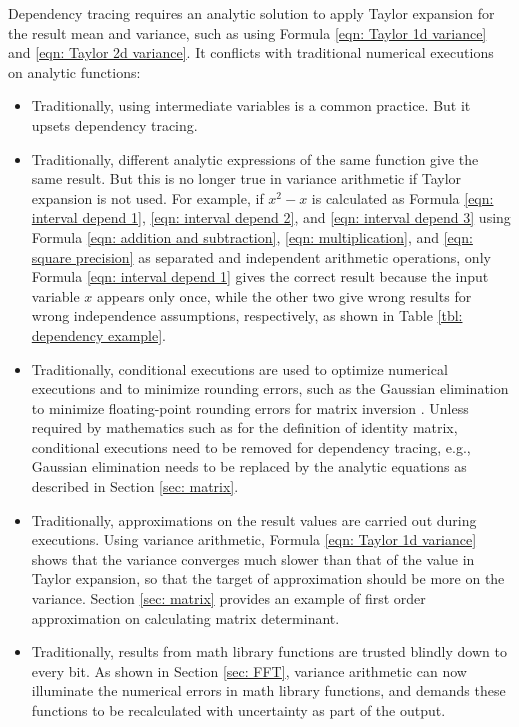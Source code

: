 \documentclass[twoside]{article}
\numberwithin{equation}{section}
\begin{document}
Dependency tracing requires an analytic solution to apply Taylor expansion for the result mean and variance, such as using Formula \eqref{eqn: Taylor 1d variance} and \eqref{eqn: Taylor 2d variance}.
It conflicts with traditional numerical executions on analytic functions:
\begin{itemize}

\item
Traditionally, using intermediate variables is a common practice.
But it upsets dependency tracing.

\item 
Traditionally, different analytic expressions of the same function give the same result.
But this is no longer true in variance arithmetic if Taylor expansion is not used.
For example, if $x^2 - x$ is calculated as Formula \eqref{eqn: interval depend 1}, \eqref{eqn: interval depend 2}, and \eqref{eqn: interval depend 3} using Formula \eqref{eqn: addition and subtraction}, \eqref{eqn: multiplication}, and \eqref{eqn: square precision} as separated and independent arithmetic operations, only Formula \eqref{eqn: interval depend 1} gives the correct result because the input variable $x$ appears only once, while the other two give wrong results for wrong independence assumptions, respectively, as shown in Table \ref{tbl: dependency example}.

\item
Traditionally, conditional executions are used to optimize numerical executions and to minimize rounding errors, such as the Gaussian elimination to minimize floating-point rounding errors for matrix inversion \cite{Linear_Algebra}.  
Unless required by mathematics such as for the definition of identity matrix, conditional executions need to be removed for dependency tracing, e.g., Gaussian elimination needs to be replaced by the analytic equations as described in Section \ref{sec: matrix}.

\item 
Traditionally, approximations on the result values are carried out during executions.
Using variance arithmetic, Formula \eqref{eqn: Taylor 1d variance} shows that the variance converges much slower than that of the value in Taylor expansion, so that the target of approximation should be more on the variance.
Section \ref{sec: matrix} provides an example of first order approximation on calculating matrix determinant.

\item
Traditionally, results from math library functions are trusted blindly down to every bit.
As shown in Section \ref{sec: FFT}, variance arithmetic can now illuminate the numerical errors in math library functions, and demands these functions to be recalculated with uncertainty as part of the output.


\end{itemize}
\end{document}
